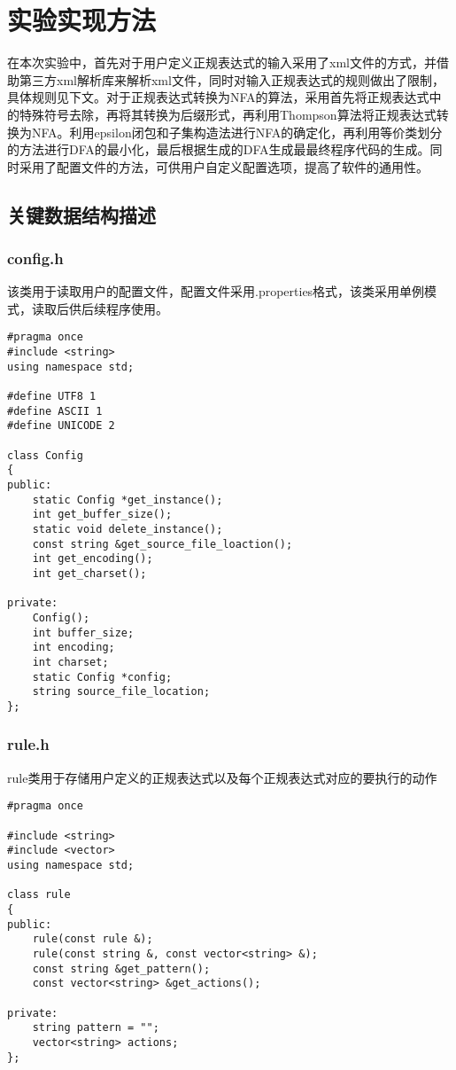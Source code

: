 \section{实验实现方法}
在本次实验中，首先对于用户定义正规表达式的输入采用了xml文件的方式，并借助第三方xml解析库来解析xml文件，同时对输入正规表达式的规则做出了限制，具体规则见下文。对于正规表达式转换为NFA的算法，采用首先将正规表达式中的特殊符号去除，再将其转换为后缀形式，再利用Thompson算法将正规表达式转换为NFA。利用epsilon闭包和子集构造法进行NFA的确定化，再利用等价类划分的方法进行DFA的最小化，最后根据生成的DFA生成最最终程序代码的生成。同时采用了配置文件的方法，可供用户自定义配置选项，提高了软件的通用性。
\subsection{关键数据结构描述}
\subsubsection{config.h}
该类用于读取用户的配置文件，配置文件采用.properties格式，该类采用单例模式，读取后供后续程序使用。
\lstset{language=C++}
\begin{lstlisting}
#pragma once
#include <string>
using namespace std;

#define UTF8 1
#define ASCII 1
#define UNICODE 2

class Config
{
public:
    static Config *get_instance();
    int get_buffer_size();
    static void delete_instance();
    const string &get_source_file_loaction();
    int get_encoding();
    int get_charset();

private:
    Config();
    int buffer_size;
    int encoding;
    int charset;
    static Config *config;
    string source_file_location;
};
\end{lstlisting}
\subsubsection{rule.h}
rule类用于存储用户定义的正规表达式以及每个正规表达式对应的要执行的动作
\lstset{language=C++}
\begin{lstlisting}
#pragma once

#include <string>
#include <vector>
using namespace std;

class rule
{
public:
    rule(const rule &);
    rule(const string &, const vector<string> &);
    const string &get_pattern();
    const vector<string> &get_actions();

private:
    string pattern = "";
    vector<string> actions;
};
\end{lstlisting}
